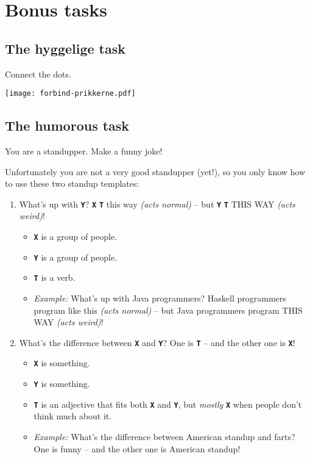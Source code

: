 \section{\huge{Bonus tasks}}

\subsection{The hyggelige task}

Connect the dots.

\begin{center}
\texttt{[image: forbind-prikkerne.pdf]}
\end{center}


\newpage

\subsection{The humorous task}

You are a standupper.  Make a funny joke!

Unfortunately you are not a very good standupper (yet!), so you only know how to
use these two standup templates:

\newcommand{\var}[1]{\textbf{\texttt{#1}}}
\begin{enumerate}
\item What's up with \var{Y}?  \var{X} \var{T} this way \emph{(acts normal)} --
but \var{Y} \var{T} THIS WAY \emph{(acts weird)}!
\begin{itemize}
\item \var{X} is a group of people.
\item \var{Y} is a group of people.
\item \var{T} is a verb.
\item \emph{Example:} What's up with Java programmers?  Haskell programmers
program like this \emph{(acts normal)} -- but Java programmers program THIS WAY
\emph{(acts weird)}!
\end{itemize}
\item What's the difference between \var{X} and \var{Y}?  One is \var{T} -- and
the other one is \var{X}!
\begin{itemize}
\item \var{X} is something.
\item \var{Y} is something.
\item \var{T} is an adjective that fits both \var{X} and \var{Y}, but
\emph{mostly} \var{X} when people don't think much about it.
\item \emph{Example:} What's the difference between American standup and farts?
One is funny -- and the other one is American standup!
\end{itemize}
\end{enumerate}

